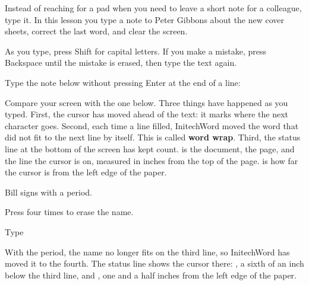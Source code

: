 Instead of reaching for a pad when you need to leave a short note for a
colleague, type it.  In this lesson you type a note to Peter Gibbons about
the new cover sheets, correct the last word, and clear the screen.

As you type, press Shift for capital letters.  If you make a mistake, press
Backspace until the mistake is erased, then type the text again.
\begin{WPSteps}
\item Type the note below without pressing Enter at the end of a line:
\end{WPSteps}
Compare your screen with the one below.
Three things have happened as you typed.  First, the cursor has moved ahead
of the text: it marks where the next character goes.  Second, each time a
line filled, InitechWord moved the word that did not fit to the next line
by itself.  This is called \textbf{word wrap}.  Third, the status line at the
bottom of the screen has kept count.   is the document,  the page, and  the line the cursor is on, measured in
inches from the top of the page.   is how far the cursor is
from the left edge of the paper.

Bill signs with a period.
\begin{WPSteps}
\item Press  four times to erase the name.
\item Type 
\end{WPSteps}
With the period, the name no longer fits on the third line, so InitechWord
has moved it to the fourth.  The status line shows the cursor there:
, a sixth of an inch below the third line, and , one and a half inches from the left edge of the paper.

